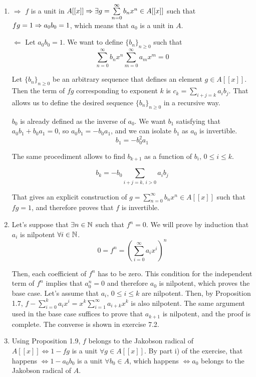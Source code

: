 \begin{sol}
	\begin{enumerate}[label=(\roman*)]
		\item $\boxed{\Rightarrow}$ $f$ is a unit in $A[[x]] \Rightarrow \exists g = \sum\limits_{n = 0}^{\infty} b_nx^n \in A[[x]]$ such that $fg = 1 \Rightarrow a_0 b_0 = 1$, which means that $a_0$ is a unit in $A$. 
		
		$\boxed{\Leftarrow}$ Let $a_0 b_0 = 1$. We want to define $\{b_n\}_{n \geq 0}$ such that 
		\[
			\sum\limits_{n = 0}^{\infty} b_nx^n \sum\limits_{m = 0}^{\infty} a_mx^m = 0
		\]

		Let $\{b_n\}_{n \geq 0}$ be an arbitrary sequence that defines an element $g \in A[[x]]$. Then the term of $fg$ corresponding to exponent $k$ is $c_k = \sum_{i+j = k} a_i b_j$. That allows us to define the desired sequence $\{b_n\}_{n \geq 0}$ in a recursive way. 

		$b_0$ is already defined as the inverse of $a_0$. We want $b_1$ satisfying that $a_0 b_1 + b_0 a_1 = 0$, so $a_0 b_1 = -b_0 a_1$, and we can isolate $b_1$ as $a_0$ is invertible.
		\[
			b_1 = -b_0^2 a_1
		\]

		The same procediment allows to find $b_{k+1}$ as a function of $b_i, \, 0\leq i\leq k$. 

		\[
			b_k = -b_0\sum_{i+j = k, \, i>0} a_i b_j
		\]

		That gives an explicit construction of $g = \sum\limits_{n = 0}^{\infty} b_nx^n \in A[[x]]$ such that $fg = 1$, and therefore proves that $f$ is invertible.

		\item Let's suppose that $\exists n \in \mathbb{N}$ such that $f^n = 0$. We will prove by induction that $a_i$ is nilpotent $\forall i \in \mathbb{N}$.
		\[
			0 = f^n =  \left ( \sum_{i = 0}^\infty a_i x^i \right )^n
		\]

		Then, each coefficient of $f^n$ has to be zero. This condition for the independent term of $f^n$ implies that $a_0^n = 0$ and therefore $a_0$ is nilpotent, which proves the base case. Let's assume that $a_i, \, 0 \leq i \leq k$ are nilpotent. Then, by Proposition 1.7, $f-\sum_{i = 0}^k a_i x^i = x^{k}\sum_{i = 1}^\infty a_{i+k} x^k$ is also nilpotent. The same argument used in the base case suffices to prove that $a_{k+1}$ is nilpotent, and the proof is complete. The converse is shown in exercise 7.2.

		\item Using Proposition 1.9, $f$ belongs to the Jakobson radical of $A[[x]] \iff 1-fg$ is a unit $\forall g \in A[[x]]$. By part i) of the exercise, that happens $\iff 1-a_0b_0$ is a unit $\forall b_0 \in A$, which happens $\iff a_0$ belongs to the Jakobson radical of $A$.


\end{enumerate}
\end{sol}
